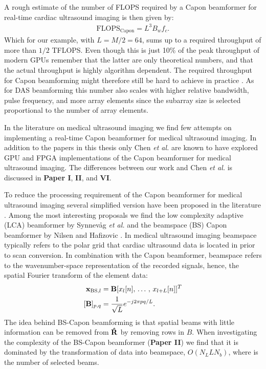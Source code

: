 A rough estimate of the number of FLOPS required by a Capon beamformer for real-time cardiac ultrasound imaging is then given by:
\begin{align}
\text{FLOPS}_{\text{Capon}} = L^3B_wf_c.
\end{align}
Which for our example, with $L=M/2=64$, sums up to a required throughput of more than $1/2$ TFLOPS. Even though this is just 10\% of the peak throughput of modern GPUs remember that the latter are only theoretical numbers, and that the actual throughput is highly algorithm dependent. The required throughput for Capon beamforming might therefore still be hard to achieve in practice \cite[\textbf{Paper II}]{So2011}. As for DAS beamforming this number also scales with higher relative bandwidth, pulse frequency, and more array elements since the subarray size is selected proportional to the number of array elements. 

In the literature on medical ultrasound imaging we find few attempts on implementing a real-time Capon beamformer for medical ultrasound imaging. In addition to the papers in this thesis only Chen \textit{et al.} \cite{Chen2011, Chen, Chen2011a} are known to have explored GPU and FPGA implementations of the Capon beamformer for medical ultrasound imaging. The differences between our work and Chen \textit{et al.} is discussed in \textbf{Paper I}, \textbf{II}, and \textbf{VI}.

To reduce the processing requirement of the Capon beamformer for medical ultrasound imaging several simplified version have been proposed in the literature \cite{Asl2012, Kim}. Among the most interesting proposals we find the low complexity adaptive (LCA) beamformer by Synnev\aa{}g \textit{et al.} \cite{Synnevag2011} and the beamspace (BS) Capon beamformer by Nilsen and Hafizovic \cite{Nilsen2009}. In medical ultrasound imaging beamspace typically refers to the polar grid that cardiac ultrasound data is located in prior to scan conversion. In combination with the Capon beamformer, beamspace refers to the wavenumber-space representation of the recorded signals, hence, the spatial Fourier transform of the element data: 
\begin{align}
\vec{x}_{\text{BS},l} &= \mat{B}[x_l[n],\,\dotso,\,x_{l+L}[n]]^T\\
[\mat{B}]_{p,q} &= \frac{1}{\sqrt{L}}e^{-j 2 \pi p q / L}.
\end{align}
The idea behind BS-Capon beamforming is that spatial beams with little information can be removed from $\mathbf{\hat{R}}$ by removing rows in $B$. When investigating the complexity of the BS-Capon beamformer (\textbf{Paper II}) we find that it is dominated by the transformation of data into beamspace, $O(N_LLN_b)$, where  is the number of selected beams. 

